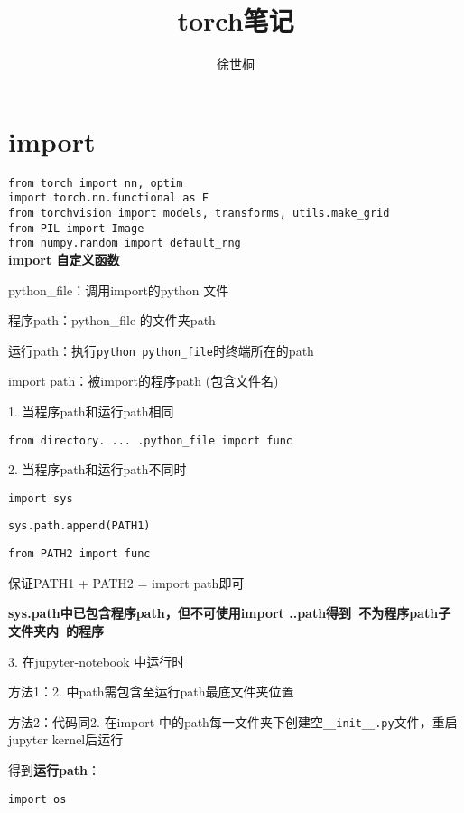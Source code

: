 \documentclass[UTF8]{ctexart}
\title{torch笔记}
\author{徐世桐}
\date{}
\begin{document}
\maketitle

\section{import}
\noindent \texttt{from torch import nn, optim}\\
\texttt{import torch.nn.functional as F}\\
\texttt{from torchvision import models, transforms, utils.make_grid}\\
\texttt{from PIL import Image}\\
\texttt{from numpy.random import default\_rng}\\
\textbf{import 自定义函数}

  python\_file：调用import的python 文件

  程序path：python\_file 的文件夹path

  运行path：执行\texttt{python python\_file}时终端所在的path

  import path：被import的程序path (包含文件名)

  1. 当程序path和运行path相同

  \quad \texttt{from directory. ... .python\_file import func}

  2. 当程序path和运行path不同时

  \quad \texttt{import sys}

  \quad \texttt{sys.path.append(PATH1)}

  \quad \texttt{from PATH2 import func}

  \quad \quad 保证PATH1 + PATH2 = import path即可

  \quad \textbf{sys.path中已包含程序path，但不可使用import ..path得到\ 不为程序path子文件夹内\ 的程序}

  3. 在jupyter-notebook 中运行时

  \quad 方法1：2. 中path需包含至运行path最底文件夹位置

  \quad 方法2：代码同2. 在import 中的path每一文件夹下创建空\texttt{\_\_init\_\_.py}文件，重启jupyter kernel后运行

  得到\textbf{运行path}：

  \quad \texttt{import os}
\end{document}
